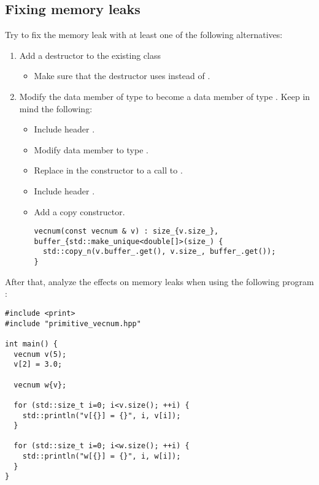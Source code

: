 \subsection{Fixing memory leaks}

Try to fix the memory leak with at least one of the following alternatives:

\begin{enumerate}

\item 
Add a destructor to the existing class
\begin{itemize}
  \item Make sure that the destructor uses
          
        instead of  .
\end{itemize}

\item 
Modify the data member of type  
to become a data member of type
.
Keep in mind the following:

\begin{itemize}
  \item Include header .

  \item Modify data member  to type .

  \item Replace  in the constructor to a call to 
        .

  \item Include header .

  \item Add a copy constructor.

\begin{lstlisting}
vecnum(const vecnum & v) : size_{v.size_}, buffer_{std::make_unique<double[]>(size_) {
  std::copy_n(v.buffer_.get(), v.size_, buffer_.get());
}
\end{lstlisting}
\end{itemize}

\end{enumerate}

After that, analyze the effects on memory leaks when using the following
program 
:

\begin{lstlisting}
#include <print>
#include "primitive_vecnum.hpp"

int main() {
  vecnum v(5);
  v[2] = 3.0;

  vecnum w{v};

  for (std::size_t i=0; i<v.size(); ++i) {
    std::println("v[{}] = {}", i, v[i]);
  }

  for (std::size_t i=0; i<w.size(); ++i) {
    std::println("w[{}] = {}", i, w[i]);
  }
}
\end{lstlisting}
